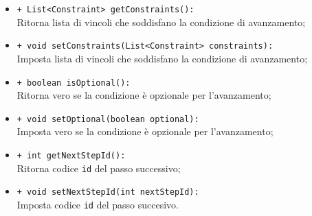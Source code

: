 \begin{flushleft}
\begin{itemize}
\begin{sloppypar}
\begin{itemize}
\item \texttt{+ List<Constraint> getConstraints():}\\ Ritorna lista di vincoli che soddisfano la condizione di avanzamento;
\item \texttt{+ void setConstraints(List<Constraint> constraints):}\\ Imposta lista di vincoli che soddisfano la condizione di avanzamento;
\item \texttt{+ boolean isOptional():}\\ Ritorna vero se la condizione è opzionale per l'avanzamento;
\item \texttt{+ void setOptional(boolean optional):}\\ Imposta vero se la condizione è opzionale per l'avanzamento;
\item \texttt{+ int getNextStepId():}\\ Ritorna codice \texttt{id} del passo successivo;
\item \texttt{+ void setNextStepId(int nextStepId):}\\ Imposta codice \texttt{id} del passo succesivo.
\end{itemize}
\end{sloppypar}
\end{itemize}
\end{flushleft}

